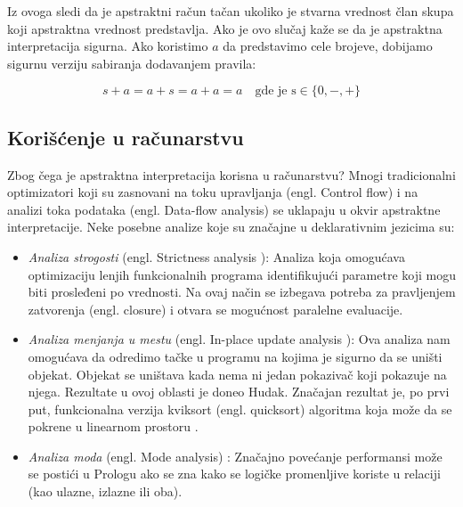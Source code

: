 Iz ovoga sledi da je apstraktni račun tačan ukoliko je stvarna vrednost član skupa koji apstraktna vrednost predstavlja. Ako je ovo slučaj kaže se da je apstraktna interpretacija sigurna. Ako koristimo $a$ da predstavimo cele brojeve, dobijamo sigurnu verziju sabiranja dodavanjem pravila:

	
$$	s + a = a + s = a + a = a \quad \text{gde je s} \in \{0, -, +\} $$ \cite{AbramskyHankin}

\subsection{Korišćenje u računarstvu}
\label{subsec:koriscenje}
Zbog čega je apstraktna interpretacija korisna u računarstvu? Mnogi tradicionalni optimizatori koji su zasnovani na toku upravljanja (engl. Control flow) i na analizi toka podataka (engl. Data-flow analysis) se uklapaju u okvir apstraktne interpretacije. Neke posebne analize koje su značajne u deklarativnim jezicima su:

\begin{itemize}
\item \textit{Analiza strogosti} (engl. Strictness analysis \cite{AbramskyHankin}):
Analiza koja omogućava optimizaciju lenjih funkcionalnih programa identifikujući parametre koji mogu biti prosleđeni po vrednosti. Na ovaj način se izbegava potreba za pravljenjem zatvorenja (engl. closure) i otvara se mogućnost paralelne evaluacije. 

\item \textit{Analiza menjanja u mestu} (engl. In-place update analysis \cite{CannPhd}):
Ova analiza nam omogućava da odredimo tačke u programu na kojima je sigurno da se uništi objekat. Objekat se uništava kada nema ni jedan pokazivač koji pokazuje na njega. Rezultate u ovoj oblasti je doneo Hudak. Značajan rezultat je, po prvi put, funkcionalna verzija kviksort (engl. quicksort) algoritma koja može da se pokrene u linearnom prostoru \cite{Girard1987}. 


\item \textit{Analiza moda} (engl. Mode analysis) \cite{AbramskyHankin}:
Značajno povećanje performansi može se postići u Prologu ako se zna kako se logičke promenljive koriste u relaciji (kao ulazne, izlazne ili oba).

\end{itemize}



